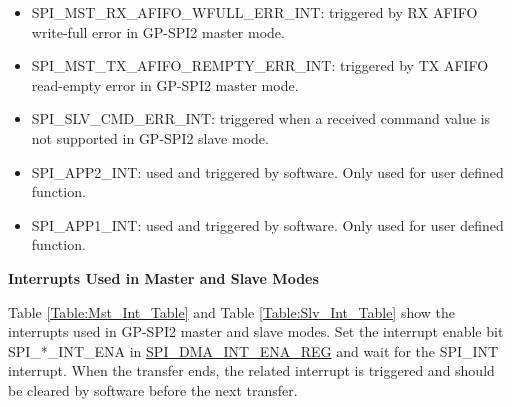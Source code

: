 \documentclass[main\_\_EN.tex]{subfiles}
\begin{document}
\begin{itemize}
\item \label{int:SPIMSTRXAFIFOWFULLERRINT}
SPI\_MST\_RX\_AFIFO\_WFULL\_ERR\_INT: triggered by RX AFIFO write-full error in GP-SPI2 master mode.

\item \label{int:SPIMSTTXAFIFOREMPTYERRINT}
SPI\_MST\_TX\_AFIFO\_REMPTY\_ERR\_INT: triggered by TX AFIFO read-empty error in GP-SPI2 master mode.

\item \label{int:SPISLVCMDERRINT} SPI\_SLV\_CMD\_ERR\_INT: triggered when a received command value is not supported in GP-SPI2 slave mode.

\item \label{int:SPIAPP2INT}SPI\_APP2\_INT: used and triggered by software. Only used for user defined function.
\item \label{int:SPIAPP1INT}SPI\_APP1\_INT: used and triggered by software. Only used for user defined function.

\end{itemize}

\textbf{Interrupts Used in Master and Slave Modes}

Table \ref{Table:Mst_Int_Table} and Table \ref{Table:Slv_Int_Table} show the interrupts used in GP-SPI2 master and slave modes. Set the interrupt enable bit SPI\_*\_INT\_ENA in \hyperref[regdesc:SPIDMAINTENAREG]{SPI\_DMA\_INT\_ENA\_REG} and wait for the SPI\_INT interrupt. When the transfer ends, the related interrupt is triggered and should be cleared by software before the next transfer.
\end{document}
